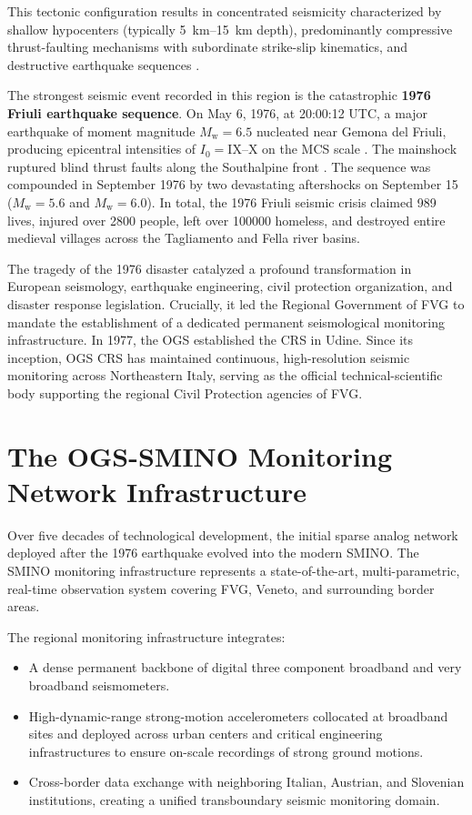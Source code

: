 This tectonic configuration results in concentrated seismicity characterized by
shallow hypocenters (typically \qtyrange{5}{15}{\kilo\meter} depth),
predominantly compressive thrust-faulting mechanisms with subordinate
strike-slip kinematics, and destructive earthquake sequences
\parencite{Sarao2021}.

The strongest seismic event recorded in this region is the catastrophic
\textbf{1976 Friuli earthquake sequence}. On May 6, 1976, at 20:00:12 UTC, a
major earthquake of moment magnitude $M_{\mathrm{w}} = \num{6.5}$ nucleated
near Gemona del Friuli, producing epicentral intensities of $I_0 =
\mathrm{IX}\text{--}\mathrm{X}$ on the \ac{MCS} scale \parencite{Locati2022}.
The mainshock ruptured blind thrust faults along the Southalpine front
\parencite{Aoudia2000}. The sequence was compounded in September 1976 by two
devastating aftershocks on September 15 ($M_{\mathrm{w}} = 5.6$ and
$M_{\mathrm{w}} = \num{6.0}$). In total, the 1976 Friuli seismic crisis claimed
\num{989} lives, injured over \num{2800} people, left over \num{100000}
homeless, and destroyed entire medieval villages across the Tagliamento and
Fella river basins.

The tragedy of the 1976 disaster catalyzed a profound transformation in
European seismology, earthquake engineering, civil protection organization, and
disaster response legislation. Crucially, it led the Regional Government of
\ac{FVG} to mandate the establishment of a dedicated permanent seismological
monitoring infrastructure. In 1977, the \acf{OGS} established the \acf{CRS} in
Udine. Since its inception, \ac{OGS} \ac{CRS} has maintained continuous,
high-resolution seismic monitoring across Northeastern Italy, serving as the
official technical-scientific body supporting the regional Civil Protection
agencies of \ac{FVG}.

\section{The \ac{OGS}-\acs{SMINO} Monitoring Network Infrastructure}
\label{sec:smino_network}

Over five decades of technological development, the initial sparse analog
network deployed after the 1976 earthquake evolved into the modern \acf{SMINO}.
The \ac{SMINO} monitoring infrastructure represents a state-of-the-art,
multi-parametric, real-time observation system covering \ac{FVG}, Veneto, and
surrounding border areas.

The regional monitoring infrastructure integrates:
\begin{itemize}
  \item A dense permanent backbone of digital three component broadband and
    very broadband seismometers.
  \item High-dynamic-range strong-motion accelerometers collocated at broadband
    sites and deployed across urban centers and critical engineering
    infrastructures to ensure on-scale recordings of strong ground motions.
  \item Cross-border data exchange with neighboring Italian, Austrian, and
    Slovenian institutions, creating a unified transboundary seismic monitoring
    domain.
\end{itemize}


